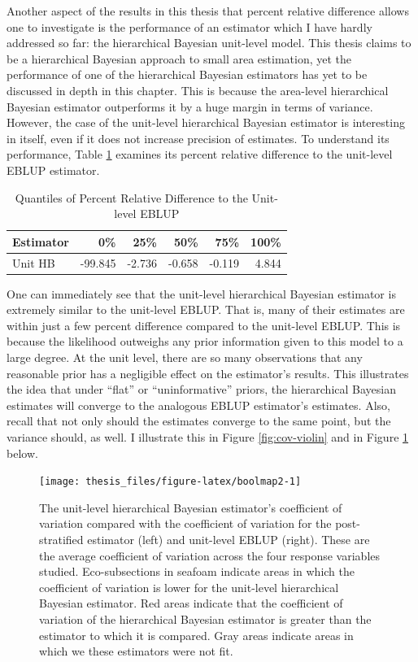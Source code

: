 \documentclass[12pt,twoside]{reedthesis}
\begin{document}
Another aspect of the results in this thesis that percent relative difference allows one to investigate is the performance of an estimator which I have hardly addressed so far: the hierarchical Bayesian unit-level model. This thesis claims to be a hierarchical Bayesian approach to small area estimation, yet the performance of one of the hierarchical Bayesian estimators has yet to be discussed in depth in this chapter. This is because the area-level hierarchical Bayesian estimator outperforms it by a huge margin in terms of variance. However, the case of the unit-level hierarchical Bayesian estimator is interesting in itself, even if it does not increase precision of estimates. To understand its performance, Table \ref{tab:prd-unit} examines its percent relative difference to the unit-level EBLUP estimator.
\begin{longtable}[t]{lrrrrr}
\caption{\label{tab:prd-unit}Quantiles of Percent Relative Difference to the Unit-level EBLUP}\\
\toprule
Estimator & 0\% & 25\% & 50\% & 75\% & 100\%\\
\midrule
Unit HB & -99.845 & -2.736 & -0.658 & -0.119 & 4.844\\
\bottomrule
\end{longtable}
One can immediately see that the unit-level hierarchical Bayesian estimator is extremely similar to the unit-level EBLUP. That is, many of their estimates are within just a few percent difference compared to the unit-level EBLUP. This is because the likelihood outweighs any prior information given to this model to a large degree. At the unit level, there are so many observations that any reasonable prior has a negligible effect on the estimator's results. This illustrates the idea that under ``flat'' or ``uninformative'' priors, the hierarchical Bayesian estimates will converge to the analogous EBLUP estimator's estimates. Also, recall that not only should the estimates converge to the same point, but the variance should, as well. I illustrate this in Figure \ref{fig:cov-violin} and in Figure \ref{fig:boolmap2} below.
\clearpage
\begin{figure}

{\centering \texttt{[image: thesis\_files/figure-latex/boolmap2-1]} 

}

\caption[Unit-level coefficient of variation comparison across the Interior West]{The unit-level hierarchical Bayesian estimator's coefficient of variation compared with the coefficient of variation for the post-stratified estimator (left) and unit-level EBLUP (right). These are the average coefficient of variation across the four response variables studied. Eco-subsections in seafoam indicate areas in which the coefficient of variation is lower for the unit-level hierarchical Bayesian estimator. Red areas indicate that the coefficient of variation of the hierarchical Bayesian estimator is greater than the estimator to which it is compared. Gray areas indicate areas in which we these estimators were not fit.}\label{fig:boolmap2}
\end{figure}
\end{document}
